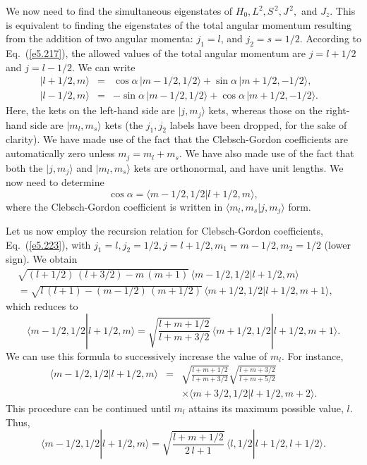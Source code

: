 We now need to find the simultaneous eigenstates of $H_0, L^2, S^{\,2}, J^{\,2},$ and $J_z$.
This is equivalent to finding the eigenstates of the total angular momentum
resulting from the  addition of  two angular momenta: $j_1=l$, and $j_2 = s = 1/2$. 
According to Eq.~(\ref{e5.217}), the allowed values of the total angular
momentum are $j=l+1/2$ and $j=l-1/2$. We can write
\begin{eqnarray}
|l+1/2, m\rangle &=& \cos\alpha\, |m-1/2, 1/2\rangle + \sin\alpha\,
|m+1/2, -1/2\rangle,~~\\[0.5ex]
|l-1/2, m\rangle &=& -\sin\alpha\, |m-1/2, 1/2\rangle + \cos\alpha\,
|m+1/2, -1/2\rangle.~~~~
\end{eqnarray}
Here, the kets on the left-hand side are $|j,m_j\rangle $ kets, whereas
those on the right-hand side are $|m_l, m_s\rangle$ kets
(the $j_1, j_2$ labels have been dropped, for the sake of clarity). We have made use
of the fact that the Clebsch-Gordon coefficients are automatically
zero unless $m_j=m_l+m_s$. We have also made use of the fact that
both the $|j,m_j\rangle $  and  $|m_l, m_s\rangle$ kets are orthonormal,
and have unit lengths. We now need to determine 
\begin{equation}
\cos\alpha = \langle m-1/2,1/2|l+1/2, m\rangle,
\end{equation}
where the Clebsch-Gordon coefficient is written in $\langle m_l, m_s| j, m_j\rangle$
form. 

Let us now employ the recursion relation for Clebsch-Gordon coefficients, Eq.~(\ref{e5.223}),
with $j_1=l, j_2 = 1/2, j = l+1/2, m_1=m-1/2, m_2=1/2$ (lower sign). 
We obtain 
\begin{eqnarray}
\sqrt{(l+1/2)\,(l+3/2)-m\,(m+1)} \,\langle m-1/2, 1/2|l+1/2, m\rangle&&\nonumber\\[0.5ex]
= \sqrt{l\,(l+1)-(m-1/2)\,(m+1/2)}\, \langle m+1/2, 1/2|l+1/2, m+1\rangle,&&
\end{eqnarray}
which reduces to
\begin{equation}
\langle m-1/2, 1/2|l+1/2, m\rangle = \sqrt{\frac{l+m+1/2}{l+m+3/2}}\,
 \langle m+1/2, 1/2|l+1/2, m+1\rangle.
\end{equation}
We can use this formula to successively increase the value of $m_l$. For
instance,
\begin{eqnarray}
\langle m-1/2, 1/2|l+1/2, m\rangle &=& \sqrt{\frac{l+m+1/2}{l+m+3/2}}
\sqrt{\frac{l+m+3/2}{l+m+5/2}}\nonumber\\[0.5ex]
&&\times  \langle m+3/2, 1/2|l+1/2, m+2\rangle.
\end{eqnarray}
This procedure can be continued until $m_l$ attains its maximum possible value,
$l$. Thus,
\begin{equation}\label{e6.110}
\langle m-1/2, 1/2|l+1/2, m\rangle = \sqrt{\frac{l+m+1/2}{2\,l+1}}\,
 \langle l, 1/2|l+1/2, l+1/2\rangle.
\end{equation}

